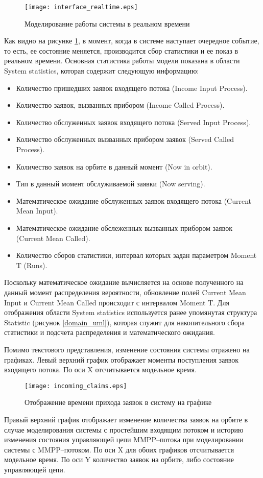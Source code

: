   \begin{figure}[H]
	\centering
	\texttt{[image: interface\_realtime.eps]}
	\caption{Моделирование работы системы в реальном времени}
	\label{interface_realtime}
\end{figure}
Как видно на рисунке \ref{interface_realtime}, в момент, когда в системе наступает очередное событие, то есть, ее состояние меняется, производится сбор статистики и ее показ в реальном времени. Основная статистика работы модели показана в области System statistics, которая содержит следующую информацию:
\begin{itemize}
	\item Количество пришедших заявок входящего потока (Income Input Process).
	\item Количество заявок, вызванных прибором (Income Called Process).
	\item Количество обслуженных заявок входящего потока (Served Input Process).
	\item Количество обслуженных вызванных прибором заявок (Served Called Process).
	\item Количество заявок на орбите в данный момент (Now in orbit).
	\item Тип в данный момент обслуживаемой заявки (Now serving).
	\item Математическое ожидание обслуженных заявок входящего потока (Current Mean Input).
	\item Математическое ожидание обслеженных вызванных прибором заявок (Current Mean Called).
	\item Количество сборов статистики, интервал которых задан параметром Moment T (Runs).
\end{itemize}
Поскольку математическое ожидание вычисляется на основе полученного на данный момент распределения вероятности, обновление полей Current Mean Input и Current Mean Called происходит с интервалом Moment T. Для отображения области System statistics используется ранее упомянутая структура Statistic (рисунок \ref {domain_uml}), которая служит для накопительного сбора статистики и подсчета распределения и математического ожидания. 

Помимо текстового представления, изменение состояния системы отражено на графиках. Левый верхний график отображает моменты поступления заявок входящего потока. По оси X отсчитывается модельное время.
   \begin{figure}[H]
	\centering
	\texttt{[image: incoming\_claims.eps]}
	\caption{Отображение времени прихода заявок в систему на графике}
	\label{interface_incoming_claims}
\end{figure}
Правый верхний график отображает изменение количества заявок на орбите в случае моделирования системы с простейшим входящим потоком и историю изменения состояния управляющей цепи MMPP--потока при моделировании системы с MMPP--потоком. По оси X для обоих графиков отсчитывается модельное время. По оси Y количество заявок на орбите, либо состояние управляющей цепи.

